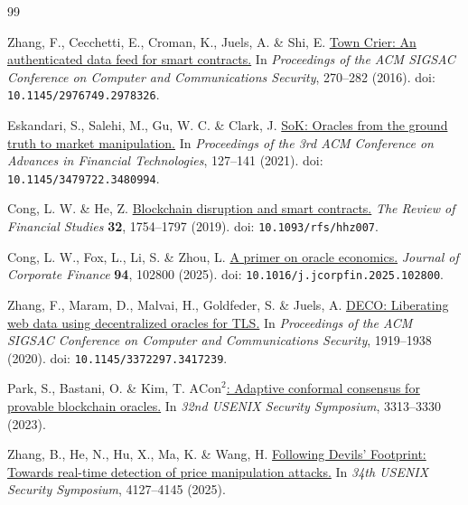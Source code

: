 \begin{thebibliography}{99}
\raggedright
{}

Zhang, F., Cecchetti, E., Croman, K., Juels, A. \& Shi, E.
\href{https://doi.org/10.1145/2976749.2978326}{Town Crier: An authenticated data feed for smart contracts.}
In \emph{Proceedings of the ACM SIGSAC Conference on Computer and Communications Security}, 270--282 (2016).
doi: \nolinkurl{10.1145/2976749.2978326}.

Eskandari, S., Salehi, M., Gu, W. C. \& Clark, J.
\href{https://doi.org/10.1145/3479722.3480994}{SoK: Oracles from the ground truth to market manipulation.}
In \emph{Proceedings of the 3rd ACM Conference on Advances in \linebreak Financial Technologies}, 127--141 (2021).
doi: \nolinkurl{10.1145/3479722.3480994}.

Cong, L. W. \& He, Z.
\href{https://doi.org/10.1093/rfs/hhz007}{Blockchain disruption and smart contracts.}
\linebreak
\emph{The Review of Financial Studies} \textbf{32}, 1754--1797 (2019).
doi: \nolinkurl{10.1093/rfs/hhz007}.

Cong, L. W., Fox, L., Li, S. \& Zhou, L.
\href{https://doi.org/10.1016/j.jcorpfin.2025.102800}{A primer on oracle economics.}
\emph{Journal of Corporate Finance} \textbf{94}, 102800 (2025).
doi: \nolinkurl{10.1016/j.jcorpfin.2025.102800}.

Zhang, F., Maram, D., Malvai, H., Goldfeder, S. \& Juels, A.
\href{https://doi.org/10.1145/3372297.3417239}{DECO: Liberating web data using decentralized oracles for TLS.}
In \emph{Proceedings of the ACM SIGSAC Conference on Computer and Communications Security}, 1919--1938 (2020).
doi: \nolinkurl{10.1145/3372297.3417239}.

Park, S., Bastani, O. \& Kim, T.
\href{https://www.usenix.org/conference/usenixsecurity23/presentation/park}{$\mathrm{ACon}^{2}$: Adaptive conformal consensus for provable blockchain oracles.}
In \emph{32nd USENIX Security Symposium}, 3313--3330 (2023).


Zhang, B., He, N., Hu, X., Ma, K. \& Wang, H.
\href{https://www.usenix.org/conference/usenixsecurity25/presentation/zhang-bosi}{Following Devils' Footprint: Towards real-time detection of price manipulation attacks.}
In \emph{34th USENIX Security Symposium}, 4127--4145 (2025).



\end{thebibliography}
